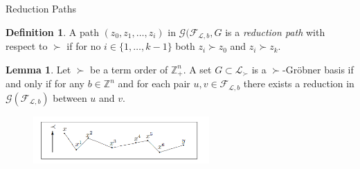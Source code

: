 \documentclass[9pt]{beamer}
\newcommand\set[1]{\{#1\}}
\newcommand\Z{\mathbb{Z}}
\theoremstyle{definition}
\newtheorem{lem}{Lemma}
\newtheorem{defn}{Definition}
\begin{document}
\begin{frame}[fragile]{Reduction Paths}
  \begin{defn}
    A path $(z_0, z_1, \dots, z_i)$ in $\mathcal{G}(\mathcal{F}_{\mathcal{L}, b}, G$ is
    a \emph{reduction path} with respect to $\succ$ if for no $i \in \set{1, \dots, k-1}$
    both $z_i \succ z_0$ and $ z_i \succ z_k$.
  \end{defn}

  \begin{lem}
    Let $\succ$ be a term order of $\Z^n_+$. A set $G \subset \mathcal{L}_{\succ}$
    is a $\succ$-Gr\"obner basis if and only if for any $b \in \Z^n$ and for
    each pair $u, v \in \mathcal{F}_{\mathcal{L}, b}$ there exists a reduction in
    $\mathcal{G}(\mathcal{F}_{\mathcal{L}, b})$ between $u$ and $v$.
  \end{lem}
    \begin{figure}
    \includegraphics[width=0.6\textwidth, height=0.2\textheight]{images/reduction}
  \end{figure}
\end{frame}
\end{document}
